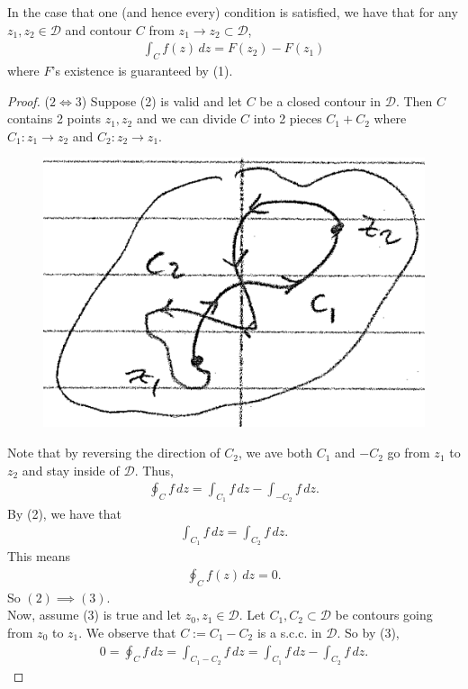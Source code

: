 \documentclass{article}
\theoremstyle{definition}
\begin{document}
In the case that one (and hence every) condition is satisfied, we have that for any $z_1, z_2 \in \mathcal{D}$ and contour $C$ from $z_1 \to z_2 \subset \mathcal{D}$, 
\begin{align}
\int_C f(z)\,dz = F(z_2) - F(z_1)
\end{align}
where $F$'s existence is guaranteed by (1).



\begin{proof}
	($2\iff 3$) Suppose (2) is valid and let $C$ be a closed contour in $\mathcal{D}$. Then $C$ contains 2 points $z_1,z_2$ and we can divide $C$ into 2 pieces $C_1 + C_2$ where $C_1: z_1 \to z_2$ and $C_2: z_2 \to z_1$.
	
	\begin{figure}[!htb]
		\centering
		\includegraphics[scale=0.25]{c1c2}
	\end{figure}

	Note that by reversing the direction of $C_2$, we ave both $C_1$ and $-C_2$ go from $z_1$ to $z_2$ and stay inside of $\mathcal{D}$. Thus, 
	\begin{align}
	\oint_{C}f\,dz = \int_{C_1} f\,dz - \int_{-C_2}f\,dz.
	\end{align}
	By (2), we have that
	\begin{align}
	\int_{C_1} f\,dz = \int_{C_2}f\,dz.
	\end{align}
	This means 
	\begin{align}
	\oint_C f(z)\,dz = 0.
	\end{align}
	So $(2) \implies (3)$.\\
	
	Now, assume (3) is true and let $z_0, z_1 \in \mathcal{D}$. Let $C_1, C_2 \subset \mathcal{D}$ be contours going from $z_0$ to $z_1$. We observe that $C:= C_1 - C_2$ is a s.c.c. in $\mathcal{D}$. So by (3),
	\begin{align}
	0 = \oint_C f\,dz = \int_{C_1 - C_2}f\,dz = \int_{C_1} f\,dz - \int_{C_2}f\,dz.
	\end{align}	
	

\end{proof}
\end{document}
